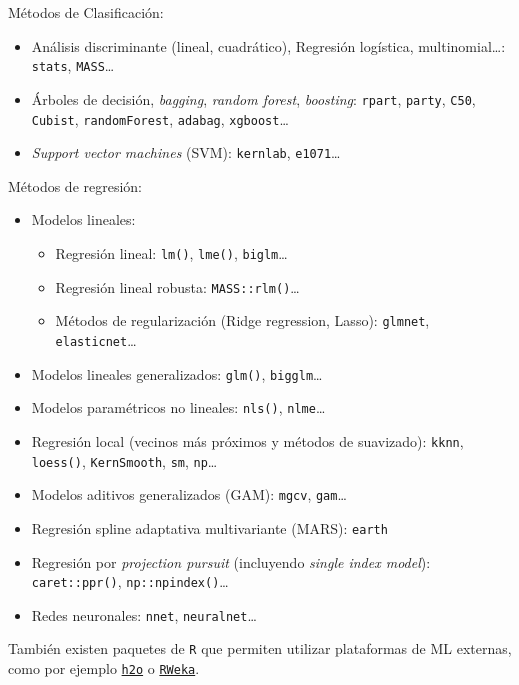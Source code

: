 \documentclass[
]{book}
\theoremstyle{break}
\theoremstyle{nonumberplain}
\begin{document}
Métodos de Clasificación:

\begin{itemize}
\item
  Análisis discriminante (lineal, cuadrático), Regresión logística, multinomial\ldots: \texttt{stats}, \texttt{MASS}\ldots{}
\item
  Árboles de decisión, \emph{bagging}, \emph{random forest}, \emph{boosting}: \texttt{rpart}, \texttt{party}, \texttt{C50}, \texttt{Cubist}, \texttt{randomForest}, \texttt{adabag}, \texttt{xgboost}\ldots{}
\item
  \emph{Support vector machines} (SVM): \texttt{kernlab}, \texttt{e1071}\ldots{}
\end{itemize}

Métodos de regresión:

\begin{itemize}
\item
  Modelos lineales:

  \begin{itemize}
  \item
    Regresión lineal: \texttt{lm()}, \texttt{lme()}, \texttt{biglm}\ldots{}
  \item
    Regresión lineal robusta: \texttt{MASS::rlm()}\ldots{}
  \item
    Métodos de regularización (Ridge regression, Lasso): \texttt{glmnet}, \texttt{elasticnet}\ldots{}
  \end{itemize}
\item
  Modelos lineales generalizados: \texttt{glm()}, \texttt{bigglm}\ldots{}
\item
  Modelos paramétricos no lineales: \texttt{nls()}, \texttt{nlme}\ldots{}
\item
  Regresión local (vecinos más próximos y métodos de suavizado): \texttt{kknn}, \texttt{loess()}, \texttt{KernSmooth}, \texttt{sm}, \texttt{np}\ldots{}
\item
  Modelos aditivos generalizados (GAM): \texttt{mgcv}, \texttt{gam}\ldots{}
\item
  Regresión spline adaptativa multivariante (MARS): \texttt{earth}
\item
  Regresión por \emph{projection pursuit} (incluyendo \emph{single index model}): \texttt{caret::ppr()}, \texttt{np::npindex()}\ldots{}
\item
  Redes neuronales: \texttt{nnet}, \texttt{neuralnet}\ldots{}
\end{itemize}

También existen paquetes de \texttt{R} que permiten utilizar plataformas de ML externas, como por ejemplo \href{https://github.com/h2oai/h2o-3/tree/master/h2o-r}{\texttt{h2o}} o \href{https://CRAN.R-project.org/package=RWeka}{\texttt{RWeka}}.
\end{document}
